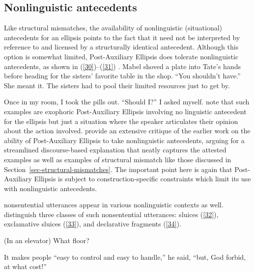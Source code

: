 \subsection{Nonlinguistic antecedents}
\label{sec-nonlinguistic-antecedents}

Like structural mismatches, the availability of nonlinguistic (situational) antecedents for an ellipsis points to the fact that it need not be interpreted by reference to and licensed by a structurally identical antecedent. Although this option is somewhat limited, Post-Auxiliary Ellipsis does tolerate nonlinguistic antecedents, as shown in (\ref{30})--(\ref{31}) \citep[see also][]{Hankamer1976, Schachter1977}.
\ea Mabel shoved a plate into Tate's hands before heading for the sisters' favorite table in the shop. ``You shouldn't have.'' She meant it. The sisters had to pool their limited resources
just to get by. \citep[ex.\ 23]{Miller2014b}\label{30}\z

\ea Once in my room, I took the pills out. ``Should I?'' I asked myself. \citep[ex.\ 22a]{Miller2014b}\label{31}\z
%
\citet{Miller2014b} note that such examples are exophoric Post-Auxiliary Ellipsis
involving no linguistic antecedent for the ellipsis but 
just a situation where the speaker articulates their opinion about the action involved. \citet{Miller2014b} provide an extensive critique of the earlier work on the ability of Post-Auxiliary Ellipsis to take nonlinguistic antecedents, arguing for a streamlined discourse-based explanation that neatly captures the attested examples as well as examples of structural mismatch like those discussed in Section~\ref{sec-structural-mismatches}. The important point here is again that Post-Auxiliary Ellipsis is subject to construction-specific constraints which limit its use with nonlinguistic antecedents.

nonsentential utterances appear in various nonlinguistic contexts as well. \citet{Ginzburg2018} distinguish three classes of such nonsentential utterances: sluices (\ref{32}), exclamative sluices (\ref{33}), and declarative fragments (\ref{34}).

\ea (In an elevator) What floor? \citep[298]{Ginzburg:Sag:2000}\label{32}\z

\ea It makes people ``easy to control and easy to handle,'' he said, ``but, God forbid, at what cost!'' \citep[96]{Ginzburg2018}
\label{33}\z


